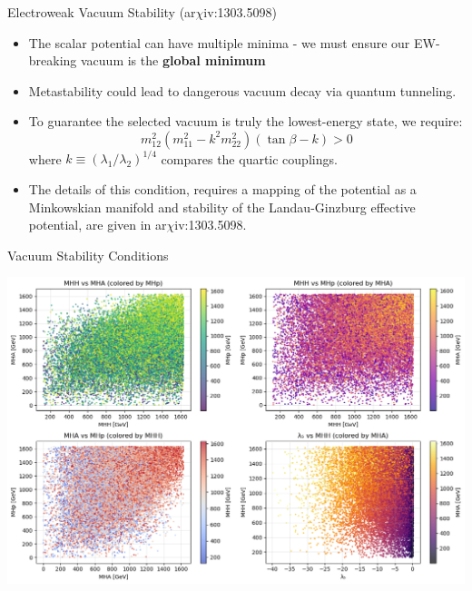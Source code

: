 \documentclass{../bredelebeamer}
\newcommand{\arxiv}{ar$\chi$iv:}
\begin{document}
\begin{frame}{Electroweak Vacuum Stability (\arxiv 1303.5098)}

\begin{itemize}
    \item The scalar potential can have multiple minima - we must ensure our EW-breaking vacuum is the \textbf{global minimum}\vfill
    
    \item Metastability could lead to dangerous vacuum decay via quantum tunneling.\vfill
    
    \item To guarantee the selected vacuum is truly the lowest-energy state, we require:
    \begin{equation*}
    m_{12}^2\left(m_{11}^2 - k^2 m_{22}^2\right)\left(\tan\beta - k\right) > 0
    \end{equation*}
    where $k \equiv (\lambda_1/\lambda_2)^{1/4}$ compares the quartic couplings. \vfill

    \item The details of this condition, requires a mapping of the potential as a Minkowskian manifold and stability of the Landau-Ginzburg effective potential, are given in \arxiv 1303.5098.
\end{itemize}

\end{frame}
\begin{frame}{Vacuum Stability Conditions}
  \begin{center}
    \includegraphics[width=\textwidth]{vacuum_stable_THDM_param_scan_analysis}
  \end{center}
    
\end{frame}
\end{document}
